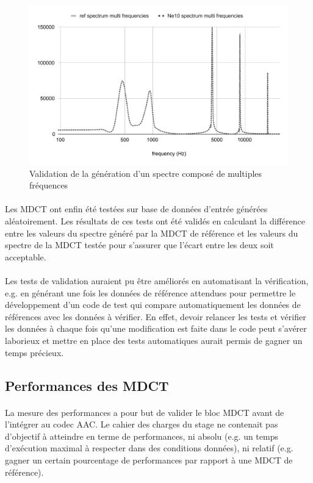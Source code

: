 \documentclass{article}
\begin{document}
    \begin{figure}[H]
        \centering
        \includegraphics[width=.8\linewidth]{./images/validation_multi_freq.pdf}
        \caption{Validation de la génération d'un spectre composé de multiples fréquences}
        \label{fig:validation_multi_freq}
    \end{figure}

    \paragraph{}
    Les MDCT ont enfin été testées sur base de données d'entrée générées aléatoirement. Les résultats de ces tests ont été validés en calculant la différence entre les valeurs du spectre généré par la MDCT de référence et les valeurs du spectre de la MDCT testée pour s'assurer que l'écart entre les deux soit acceptable.

    \paragraph{}
    Les tests de validation auraient pu être améliorés en automatisant la vérification, e.g. en générant une fois les données de référence attendues pour permettre le développement d'un code de test qui compare automatiquement les données de références avec les données à vérifier. En effet, devoir relancer les tests et vérifier les données à chaque fois qu'une modification est faite dans le code peut s'avérer laborieux et mettre en place des tests automatiques aurait permis de gagner un temps précieux.



    \subsection{Performances des MDCT}
    \label{sec:mdct_perfs}
    \paragraph{}
    La mesure des performances a pour but de valider le bloc MDCT avant de l'intégrer au codec AAC. Le cahier des charges du stage ne contenait pas d'objectif à atteindre en terme de performances, ni absolu (e.g. un temps d'exécution maximal à respecter dans des conditions données), ni relatif (e.g. gagner un certain pourcentage de performances par rapport à une MDCT de référence).
\end{document}
